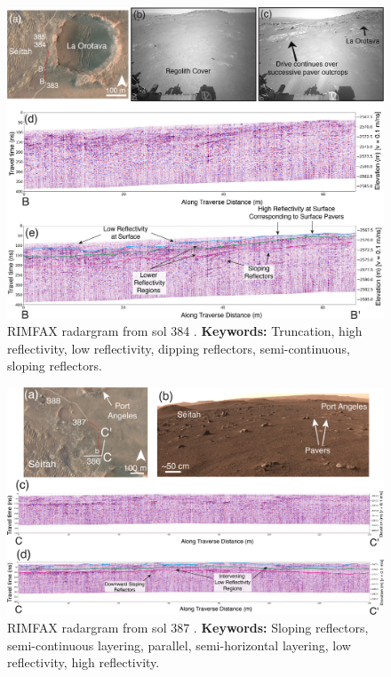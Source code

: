 \begin{figure}[h!]
    \centering
    \includegraphics[width=0.9\linewidth]{Figures/0.5RIMFAX/Shoemaker_2024-f5.jpg}
    \caption[RIMFAX radargram from sol 384]{RIMFAX radargram from sol 384 \citep{shoemaker2024}. \textbf{Keywords:} Truncation, high reflectivity, low reflectivity, dipping reflectors, semi-continuous, sloping reflectors.}
    \label{fig:Shoemaker24-5}
\end{figure}

\begin{figure}[h!]
    \centering
    \includegraphics[width=0.9\linewidth]{Figures/0.5RIMFAX/Shoemaker_2024-f8.jpg}
    \caption[RIMFAX radargram from sol 387.]{RIMFAX radargram from sol 387 \citep{shoemaker2024}. \textbf{Keywords:} Sloping reflectors, semi-continuous layering, parallel, semi-horizontal layering, low reflectivity, high reflectivity.}
    \label{fig:Shoemaker24-8}
\end{figure}


